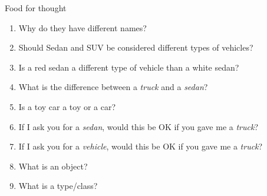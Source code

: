 \begin{frame}{Food for thought}
    \begin{enumerate}
        \item Why do they have different names? \pause %
        \item Should Sedan and SUV be considered different types of vehicles? \pause %
        \item Is a red sedan a different type of vehicle than a white sedan? \pause %
        \item What is the difference between a \textit{truck} and a \textit{sedan}? \pause %
        \item Is a toy car a toy or a car? \pause %
        \item If I ask you for a \textit{sedan}, would this be OK if you gave me a \textit{truck}? \pause 	%
        \item If I ask you for a \textit{vehicle}, would this be OK if you gave me a \textit{truck}? \pause  %
        

        \item What is an object? \pause
        \item What is a type/class? \pause
        
    \end{enumerate}
    
    
\end{frame}
